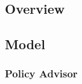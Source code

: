 \documentclass{article}
\begin{document}
	    \subsection{Overview}




	    \subsection{Model}

            \subsubsection{Policy Advisor}
\end{document}
